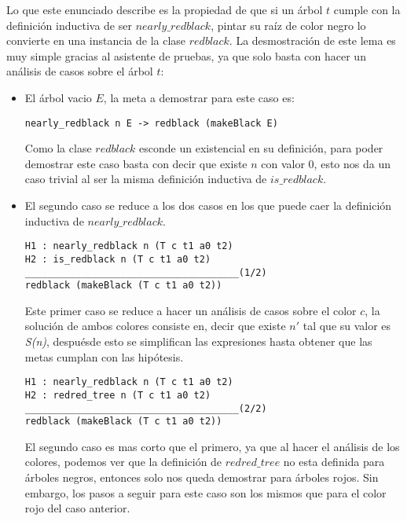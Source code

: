 Lo que este enunciado describe es la propiedad de que si un \'arbol $t$ cumple con la definici\'on
inductiva de ser \hyperref[inductive_isRedB]{$nearly\_redblack$}, pintar su raíz de color negro lo 
convierte en una instancia de la clase \hyperref[class_rb]{$redblack$}. La desmostraci\'on de este 
lema es muy simple gracias al asistente de pruebas, ya que solo basta con hacer un análisis de casos 
sobre el \'arbol $t$:

\begin{itemize}
  \item El \'arbol vacio $E$, la meta a demostrar para este caso es:
\begin{verbatim}
nearly_redblack n E -> redblack (makeBlack E)
\end{verbatim}
        Como la clase \hyperref[class_rb]{$redblack$} esconde un existencial en su definici\'on, 
        para poder demostrar este caso basta con decir que existe $n$ con valor 0, esto nos da un 
        caso trivial al ser la misma definici\'on inductiva de 
        \hyperref[inductive_isRedB]{$is\_redblack$}.
  \item El segundo caso se reduce a los dos casos en los que puede caer la definici\'on inductiva
  de \hyperref[inductive_isRedB]{$nearly\_redblack$}.
\begin{verbatim}
H1 : nearly_redblack n (T c t1 a0 t2)
H2 : is_redblack n (T c t1 a0 t2)
______________________________________(1/2)
redblack (makeBlack (T c t1 a0 t2))
\end{verbatim}
        Este primer caso se reduce a hacer un análisis de casos sobre el color $c$, la soluci\'on
        de ambos colores consiste en, decir que existe $n'$ tal que su valor es \textit{S(n)},
        despuésde esto se simplifican las expresiones hasta obtener que las metas cumplan con las
        hip\'otesis.
\begin{verbatim}
H1 : nearly_redblack n (T c t1 a0 t2)
H2 : redred_tree n (T c t1 a0 t2)
______________________________________(2/2)
redblack (makeBlack (T c t1 a0 t2))
\end{verbatim}
        El segundo caso es mas corto que el primero, ya que al hacer el análisis de los colores,
        podemos ver que la definición de \hyperref[inductive_isRedB]{$redred\_tree$} no esta 
        definida para \'arboles negros, entonces solo nos queda demostrar para \'arboles rojos. Sin 
        embargo, los pasos a seguir para este caso son los mismos que para el color rojo del caso 
        anterior.
\end{itemize}


